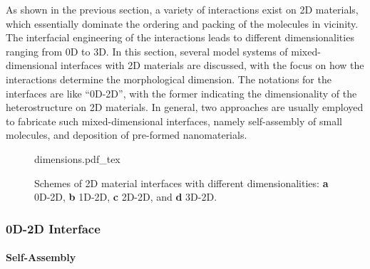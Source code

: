 As shown in the previous section, a variety of interactions exist on 2D
materials, which
essentially dominate the ordering and packing of the molecules in vicinity.
%
The interfacial engineering of the interactions leads to different
dimensionalities ranging from 0D to 3D.
%
In this section, several model systems of mixed-dimensional interfaces
with 2D materials are discussed, with the focus on how the
interactions determine the morphological dimension. The notations for
the interfaces are like ``0D-2D'', with the former indicating the
dimensionality of the heterostructure on 2D materials. In general, two
approaches are usually employed to fabricate such mixed-dimensional
interfaces, namely self-assembly of small molecules, and deposition of
pre-formed nano\-materials. 

\begin{figure}[htbp]
  \centering
  {dimensions.pdf_tex}
  \caption{\label{fig:intro-dimensions} %
    Schemes of 2D material interfaces with different dimensionalities:
    \textbf{a} 0D-2D, \textbf{b} 1D-2D, \textbf{c} 2D-2D, and
    \textbf{d} 3D-2D.           %
  }
\end{figure}

\subsubsection{0D-2D Interface}
\label{sec:intro-0D-2D}

\paragraph{Self-Assembly}
\label{sec:org8117691}

